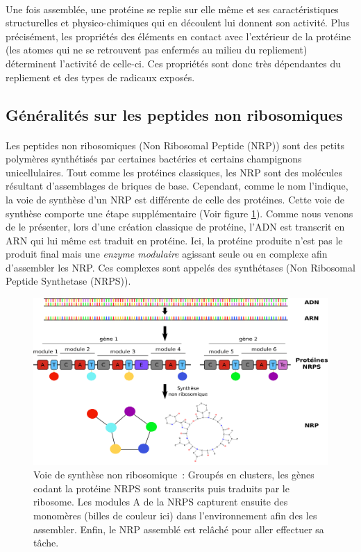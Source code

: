 \documentclass[12pt,french,twoside]{report}
\begin{document}
\paragraph{}Une fois assemblée, une protéine se replie sur elle même et ses caractéristiques structurelles et physico-chimiques qui en découlent lui donnent son activité.
Plus précisément, les propriétés des éléments en contact avec l'extérieur de la protéine (les atomes qui ne se retrouvent pas enfermés au milieu du repliement) déterminent l'activité de celle-ci.
Ces propriétés sont donc très dépendantes du repliement et des types de radicaux exposés.



\subsection{Généralités sur les peptides non ribosomiques}
\paragraph{}Les peptides non ribosomiques (Non Ribosomal Peptide (NRP)) sont des petits polymères synthétisés par certaines bactéries et certains champignons unicellulaires.
Tout comme les protéines classiques, les NRP sont des molécules résultant d'assemblages de briques de base.
Cependant, comme le nom l'indique, la voie de synthèse d'un NRP est différente de celle des protéines.
Cette voie de synthèse comporte une étape supplémentaire (Voir figure \ref{global}).
Comme nous venons de le présenter, lors d'une création classique de protéine, l'ADN est transcrit en ARN qui lui même est traduit en protéine.
Ici, la protéine produite n'est pas le produit final mais une \textit{enzyme modulaire} agissant seule ou en complexe afin d'assembler les NRP.
Ces complexes sont appelés des synthétases (Non Ribosomal Peptide Synthetase (NRPS)).

\begin{figure}[h!]
  \begin{center}
    \includegraphics[width=450px]{Figures/bio/Intro/synthese.png}
    \caption{\label{global}Voie de synthèse non ribosomique~:
    Groupés en clusters, les gènes codant la protéine NRPS sont transcrits puis traduits par le ribosome.
    Les modules A de la NRPS capturent ensuite des monomères (billes de couleur ici) dans l'environnement afin des les assembler.
    Enfin, le NRP assemblé est relâché pour aller effectuer sa tâche.
    }
  \end{center}
\end{figure}
\end{document}
